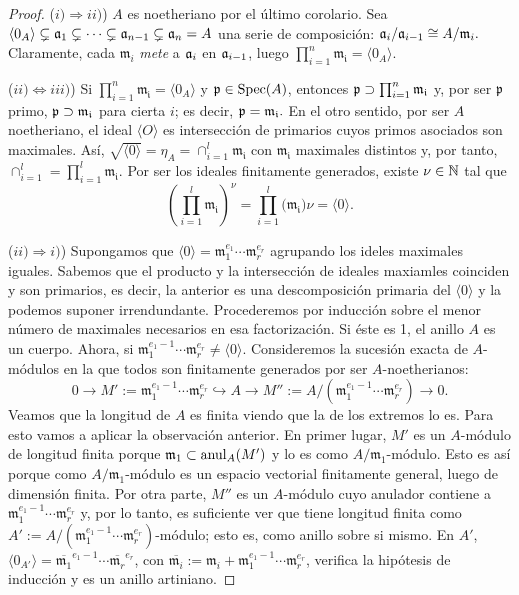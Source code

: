 \documentclass[../main.tex]{subfiles}
\begin{document}
\begin{proof} ($i)\Rightarrow ii)$) $A$ es noetheriano por el último corolario. Sea $\langle 0_A\rangle\subsetneq \mathfrak{a}_1\subsetneq\cdots\subsetneq\mathfrak{a}_{n-1}\subsetneq\mathfrak{a}_n=A$ una serie de composición: $\mathfrak{a}_i/\mathfrak{a}_{i-1}\cong A/\mathfrak{m}_i.$ Claramente, cada $\mathfrak{m}_i$ \textit{mete} a $\mathfrak{a}_i$ en $\mathfrak{a}_{i-1}$, luego $\prod_{i=1}^n\mathfrak{m_i}=\langle 0_A\rangle.$

($ii)\Leftrightarrow iii)$) Si $\prod_{i=1}^n\mathfrak{m_i}=\langle 0_A\rangle$ y $\mathfrak{p}\in\text{Spec}(A)$, entonces $\mathfrak{p}\supset \prod_{i=1}^n\mathfrak{m_i}$ y, por ser $\mathfrak{p}$ primo, $\mathfrak{p}\supset\mathfrak{m_i}$ para cierta $i$; es decir, $\mathfrak{p}=\mathfrak{m_i}.$ En el otro sentido, por ser $A$ noetheriano, el ideal $\langle O\rangle$ es intersección de primarios cuyos primos asociados son maximales. Así, $\sqrt{\langle 0\rangle}=\eta_A=\cap_{i=1}^l\mathfrak{m_i}$ con $\mathfrak{m_i}$ maximales distintos y, por tanto, $\cap_{i=1}^l=\prod_{i=1}^l\mathfrak{m_i}.$ Por ser los ideales finitamente generados, existe $\nu\in\mathbb{N}$ tal que
$$\left(\prod_{i=1}^l\mathfrak{m_i}\right)^\nu=\prod_{i=1}^l(\mathfrak{m_i)\nu}=\langle 0\rangle.$$

($ii)\Rightarrow i)$) Supongamos que $\langle 0\rangle=\mathfrak{m}_1^{e_1}\cdots\mathfrak{m}_r^{e_r}$ agrupando los ideles maximales iguales. Sabemos que el producto y la intersección de ideales maxiamles coinciden y son primarios, es decir, la anterior es una descomposición primaria del $\langle 0\rangle$ y la podemos suponer irrendundante. Procederemos por inducción sobre el menor número de maximales necesarios en esa factorización. Si éste es 1, el anillo $A$ es un cuerpo. Ahora, si $\mathfrak{m}_1^{e_1-1}\cdots\mathfrak{m}_r^{e_r}\neq\langle 0\rangle.$ Consideremos la sucesión exacta de $A$-módulos en la que todos son finitamente generados por ser $A$-noetherianos:
$$0\rightarrow M':=\mathfrak{m}_1^{e_1-1}\cdots\mathfrak{m}_r^{e_r}\hookrightarrow A\rightarrow M'':=A/(\mathfrak{m}_1^{e_1-1}\cdots\mathfrak{m}_r^{e_r})\rightarrow 0.$$
Veamos que la longitud de $A$ es finita viendo que la de los extremos lo es. Para esto vamos a aplicar la observación anterior. En primer lugar, $M'$ es un $A$-módulo de longitud finita porque $\mathfrak{m}_1\subset\operatorname{anul}_A(M')$ y lo es como $A/\mathfrak{m}_1$-módulo. Esto es así porque como $A/\mathfrak{m}_1$-módulo es un espacio vectorial finitamente general, luego de dimensión finita. Por otra parte, $M''$ es un $A$-módulo cuyo anulador contiene a $\mathfrak{m}_1^{e_1-1}\cdots\mathfrak{m}_r^{e_r}$ y, por lo tanto, es suficiente ver que tiene longitud finita como $A':=A/(\mathfrak{m}_1^{e_1-1}\cdots\mathfrak{m}_r^{e_r})$-módulo; esto es, como anillo sobre si mismo. En $A'$, $\langle 0_{A'}\rangle=\overline{\mathfrak{m}_1}^{e_1-1}\cdots\overline{\mathfrak{m}_r}^{e_r}$, con $\overline{\mathfrak{m}_i}:=\mathfrak{m}_i+\mathfrak{m}_1^{e_1-1}\cdots\mathfrak{m}_r^{e_r}$, verifica la hipótesis de inducción y es un anillo artiniano.
\end{proof}
\end{document}
